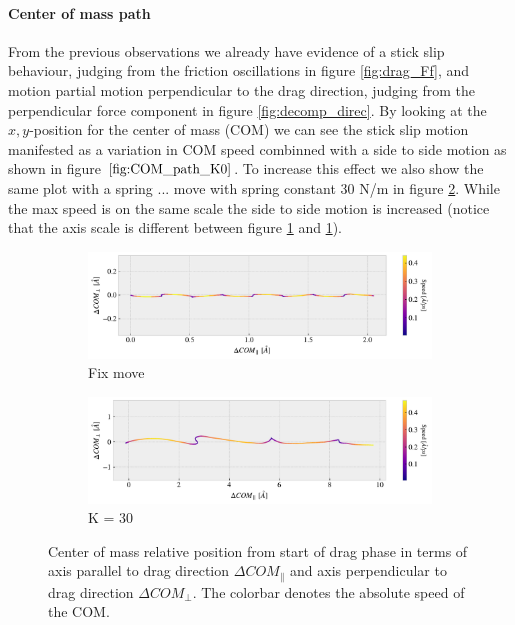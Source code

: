 \paragraph*{Center of mass path}

From the previous observations we already have evidence of a stick slip behaviour, judging from the friction oscillations in figure \ref{fig:drag_Ff}, and motion partial motion perpendicular to the drag direction, judging from the perpendicular force component in figure \ref{fig:decomp_direc}. By looking at the $x,y$-position for the center of mass (COM) we can see the stick slip motion manifested as a variation in COM speed combinned with a side to side motion as shown in figure $\ref{fig:COM_path_K0}$. To increase this effect we also show the same plot with a spring ... move with spring constant 30 N/m in figure \ref{fig:COM_path_K30}. While the max speed is on the same scale the side to side motion is increased (notice that the axis scale is different between figure \ref{fig:COM_path_K0} and \ref{fig:COM_path_K0}).


\begin{figure}[H]
  \centering
  \begin{subfigure}[b]{0.85\textwidth}
    \centering
    \includegraphics[width=\textwidth]{figures/baseline/COM_path_K0.pdf}
    \caption{Fix move}
    \label{fig:COM_path_K0}
  \end{subfigure}
  \hfill
  \begin{subfigure}[b]{0.85\textwidth}
      \centering
      \includegraphics[width=\textwidth]{figures/baseline/COM_path_K30.pdf}
      \caption{K = 30}
      \label{fig:COM_path_K30}
  \end{subfigure}
  \caption{Center of mass relative position from start of drag phase in terms of axis parallel to drag direction $\Delta COM_{\parallel}$ and axis perpendicular to drag direction $\Delta COM_{\perp}$. The colorbar denotes the absolute speed of the COM.}
  \label{fig:COM_path}
\end{figure}




